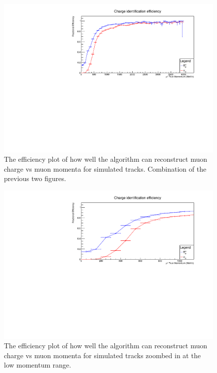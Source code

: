 \begin{figure}[h!]
\centering
\includegraphics[width=.9\textwidth]{figures/NeutrinoChap/NuFactTalk/fix3.pdf}
\caption{The efficiency plot of how well the algorithm can reconstruct muon charge vs muon momenta for simulated tracks. Combination of the previous two figures.}
\label{fig:T2KTASDCombined}
\end{figure}

\begin{figure}[h!]
\centering
\includegraphics[width=.9\textwidth]{figures/NeutrinoChap/NuFactTalk/fix4.pdf}
\caption{The efficiency plot of how well the algorithm can reconstruct muon charge vs muon momenta for simulated tracks zoombed in at the low momentum range.}
\label{fig:T2KTASDCombinedZoom}
\end{figure}

